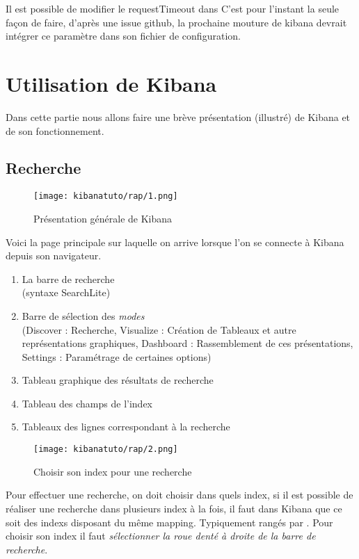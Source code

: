 Il est possible de modifier le requestTimeout dans 
C'est pour l'instant la seule façon de faire, d'après une issue github, la prochaine 
mouture de kibana devrait intégrer ce paramètre dans son fichier de configuration.

\section{Utilisation de Kibana}
Dans cette partie nous allons faire une brève présentation (illustré) de Kibana et
de son fonctionnement.

\subsection{Recherche}
\begin{figure}[H]
\center
\texttt{[image: kibanatuto/rap/1.png]}
\label{fig:kibanatuto1}
\caption{Présentation générale de Kibana}
\end{figure}

Voici la page principale sur laquelle on arrive lorsque l'on se connecte à Kibana
depuis son navigateur.

\begin{enumerate}
    \item La barre de recherche \\(syntaxe SearchLite)
    \item Barre de sélection des \emph{modes} \\(Discover : Recherche, Visualize : Création 
    de Tableaux et autre représentations graphiques, Dashboard : Rassemblement de
    ces présentations, Settings : Paramétrage de certaines options)
    \item Tableau graphique des résultats de recherche
    \item Tableau des champs de l'index
    \item Tableaux des lignes correspondant à la recherche
\end{enumerate}


\begin{figure}[H]
\center
\texttt{[image: kibanatuto/rap/2.png]}
\label{fig:kibanatuto2}
\caption{Choisir son index pour une recherche}
\end{figure}
Pour effectuer une recherche, on doit choisir dans quels index, si il est possible 
de réaliser une recherche dans plusieurs index à la fois, il faut dans Kibana que 
ce soit des indexs disposant du même mapping. Typiquement rangés par .
Pour choisir son index il faut \emph{sélectionner la roue denté à droite de la barre
de recherche}.



